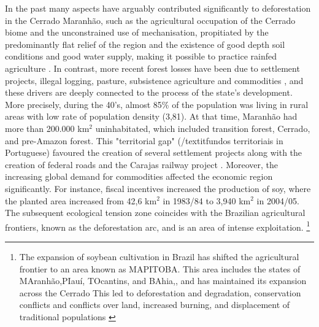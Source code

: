 In the past many aspects have arguably contributed significantly to deforestation in the Cerrado Maranhão, such as the agricultural occupation of the Cerrado biome and the unconstrained use of mechanisation, propitiated by the predominantly flat relief of the region and the existence of good depth soil conditions and good water supply, making it possible to practice rainfed agriculture \citep{bayma_sano_2015}. In contrast, more recent forest losses  have been due to settlement projects, illegal logging, pasture, subsistence agriculture and commodities \citep{CELENTANO_2017, costa_2018}, and these drivers are deeply connected to the process of the state's development. More precisely, during the 40's, almost 85\% of the population was living in rural areas with low rate of population density (3,81). At that time, Maranhão had more than 200.000 km$^{2}$ uninhabitated, which included transition forest, Cerrado, and pre-Amazon forest. This "territorial gap" (/textit{fundos territoriais} in Portuguese) favoured the creation of several settlement projects along with the creation of federal roads and the Carajas railway project \citep{ferreira_2008}. Moreover, the increasing global demand for commodities affected the economic region significantly. For instance, fiscal incentives increased the production of soy, where the planted area increased from 42,6 km$^{2}$  in 1983/84 to 3,940 km$^{2}$ in 2004/05. The subsequent ecological tension zone coincides with the Brazilian agricultural frontiers, known as the deforestation arc, and is an area of intense exploitation. \footnote{The expansion of soybean cultivation in Brazil has shifted the
agricultural frontier to an area  known as MAPITOBA. This area includes the states of MAranhão,PIauí, TOcantins, and BAhia,, and has maintained its expansion across the Cerrado This led to deforestation and degradation, conservation conflicts and conflicts over land, increased burning, and displacement of traditional populations \citep{mustin__2017}}


